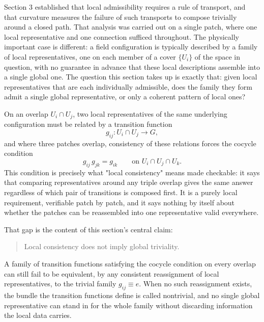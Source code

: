 \documentclass[11pt]{article}
\begin{document}
Section 3 established that local admissibility requires a rule of transport, and that curvature measures the failure of such transports to compose trivially around a closed path. That analysis was carried out on a single patch, where one local representative and one connection sufficed throughout. The physically important case is different: a field configuration is typically described by a family of local representatives, one on each member of a cover $\{U_i\}$ of the space in question, with no guarantee in advance that these local descriptions assemble into a single global one. The question this section takes up is exactly that: given local representatives that are each individually admissible, does the family they form admit a single global representative, or only a coherent pattern of local ones?

On an overlap $U_i \cap U_j$, two local representatives of the same underlying configuration must be related by a transition function
\[
g_{ij} : U_i \cap U_j \rightarrow G,
\]
and where three patches overlap, consistency of these relations forces the cocycle condition
\[
g_{ij}\,g_{jk} = g_{ik} \qquad \text{on } U_i \cap U_j \cap U_k.
\]
This condition is precisely what "local consistency" means made checkable: it says that comparing representatives around any triple overlap gives the same answer regardless of which pair of transitions is composed first. It is a purely local requirement, verifiable patch by patch, and it says nothing by itself about whether the patches can be reassembled into one representative valid everywhere.

That gap is the content of this section's central claim:
\begin{quote}
Local consistency does not imply global triviality.
\end{quote}
A family of transition functions satisfying the cocycle condition on every overlap can still fail to be equivalent, by any consistent reassignment of local representatives, to the trivial family $g_{ij} \equiv e$. When no such reassignment exists, the bundle the transition functions define is called nontrivial, and no single global representative can stand in for the whole family without discarding information the local data carries.
\end{document}
